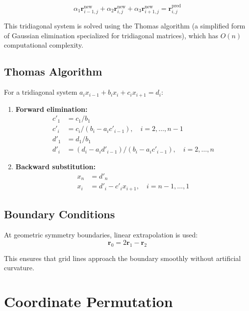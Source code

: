 \documentclass[11pt,a4paper]{report}
\newcommand{\rvec}{\bm{r}}
\begin{document}
\begin{equation}
    \alpha_1 \rvec_{i-1,j}^{\text{new}} + \alpha_2 \rvec_{i,j}^{\text{new}} + \alpha_3 \rvec_{i+1,j}^{\text{new}} = \rvec_{i,j}^{\text{pred}}
\end{equation}

This tridiagonal system is solved using the Thomas algorithm (a simplified form of Gaussian elimination specialized for tridiagonal matrices), which has $O(n)$ computational complexity.

\subsection{Thomas Algorithm}

For a tridiagonal system $a_i x_{i-1} + b_i x_i + c_i x_{i+1} = d_i$:

\begin{enumerate}
    \item \textbf{Forward elimination:}
    \begin{align}
        c'_1 &= c_1 / b_1 \\
        c'_i &= c_i / (b_i - a_i c'_{i-1}), \quad i = 2,\dots,n-1 \\
        d'_1 &= d_1 / b_1 \\
        d'_i &= (d_i - a_i d'_{i-1}) / (b_i - a_i c'_{i-1}), \quad i = 2,\dots,n
    \end{align}

    \item \textbf{Backward substitution:}
    \begin{align}
        x_n &= d'_n \\
        x_i &= d'_i - c'_i x_{i+1}, \quad i = n-1,\dots,1
    \end{align}
\end{enumerate}

\subsection{Boundary Conditions}

At geometric symmetry boundaries, linear extrapolation is used:
\begin{equation}
    \rvec_0 = 2\rvec_1 - \rvec_2
\end{equation}

This ensures that grid lines approach the boundary smoothly without artificial curvature.

\section{Coordinate Permutation}
\end{document}
